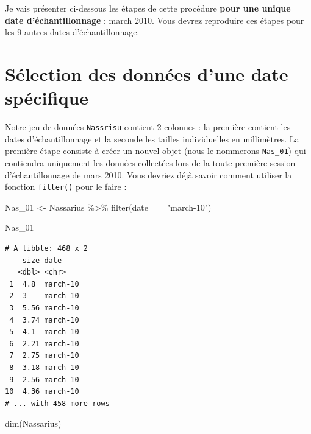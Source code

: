 \documentclass[
  a4paper,
  DIV=11,
  numbers=noendperiod,
  oneside]{scrreprt}
\newenvironment{Shaded}{}{}
\newcommand{\FunctionTok}[1]{\textcolor[rgb]{0.44,0.26,0.76}{#1}}
\newcommand{\NormalTok}[1]{\textcolor[rgb]{0.14,0.16,0.18}{#1}}
\newcommand{\OtherTok}[1]{\textcolor[rgb]{0.44,0.26,0.76}{#1}}
\newcommand{\SpecialCharTok}[1]{\textcolor[rgb]{0.00,0.36,0.77}{#1}}
\newcommand{\StringTok}[1]{\textcolor[rgb]{0.01,0.18,0.38}{#1}}
\begin{document}
Je vais présenter ci-dessous les étapes de cette procédure \textbf{pour
une unique date d'échantillonnage} : march 2010. Vous devrez reproduire
ces étapes pour les 9 autres dates d'échantillonnage.

\hypertarget{suxe9lection-des-donnuxe9es-dune-date-spuxe9cifique}{%
\section{Sélection des données d'une date
spécifique}\label{suxe9lection-des-donnuxe9es-dune-date-spuxe9cifique}}

Notre jeu de données \texttt{Nassrisu} contient 2 colonnes : la première
contient les dates d'échantillonnage et la seconde les tailles
individuelles en millimètres. La première étape consiste à créer un
nouvel objet (nous le nommerons \texttt{Nas\_01}) qui contiendra
uniquement les données collectées lors de la toute première session
d'échantillonnage de mars 2010. Vous devriez déjà savoir comment
utiliser la fonction \texttt{filter()} pour le faire :

\begin{Shaded}
\begin{Highlighting}[]
\NormalTok{Nas\_01 }\OtherTok{\textless{}{-}}\NormalTok{ Nassarius }\SpecialCharTok{\%\textgreater{}\%}
  \FunctionTok{filter}\NormalTok{(date }\SpecialCharTok{==} \StringTok{"march{-}10"}\NormalTok{)}

\NormalTok{Nas\_01}
\end{Highlighting}
\end{Shaded}

\begin{verbatim}
# A tibble: 468 x 2
    size date    
   <dbl> <chr>   
 1  4.8  march-10
 2  3    march-10
 3  5.56 march-10
 4  3.74 march-10
 5  4.1  march-10
 6  2.21 march-10
 7  2.75 march-10
 8  3.18 march-10
 9  2.56 march-10
10  4.36 march-10
# ... with 458 more rows
\end{verbatim}


\begin{Shaded}
\begin{Highlighting}[]
\FunctionTok{dim}\NormalTok{(Nassarius)}
\end{Highlighting}
\end{Shaded}
\end{document}
